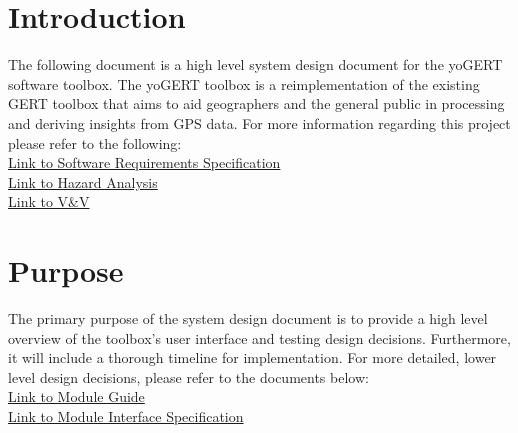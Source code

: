 \documentclass[12pt, titlepage]{article}
\begin{document}
\newpage

\tableofcontents

\newpage

\listoftables

\listoffigures

\newpage


\section{Introduction}
The following document is a high level system design document for the yoGERT software toolbox. The yoGERT toolbox is a reimplementation of the existing GERT toolbox that aims to aid geographers and the general public in processing and deriving insights from GPS data. For more information regarding this project please refer to the following: \\

\noindent\href{https://github.com/NicLobo/Capstone-yoGERT/blob/main/docs/SRS/SRS.pdf}{Link to Software Requirements Specification}\\
\noindent\href{https://github.com/NicLobo/Capstone-yoGERT/blob/main/docs/HazardAnalysis/HazardAnalysis.pdf}{Link to Hazard Analysis}\\
\noindent\href{https://github.com/NicLobo/Capstone-yoGERT/blob/main/docs/VnVPlan/VnVPlan.pdf}{Link to V\&V}\\



\section{Purpose}

The primary purpose of the system design document is to provide a high level overview of the toolbox's user interface and testing design decisions. Furthermore, it will include a thorough timeline for implementation. For more detailed, lower level design decisions, please refer to the documents below: \\

\noindent\href{https://github.com/NicLobo/Capstone-yoGERT/blob/main/docs/Design/SoftArchitecture/MG.pdf}{Link to Module Guide}\\
\noindent\href{https://github.com/NicLobo/Capstone-yoGERT/blob/main/docs/Design/SoftDetailedDes/MIS.pdf}{Link to Module Interface Specification}\\
\end{document}
